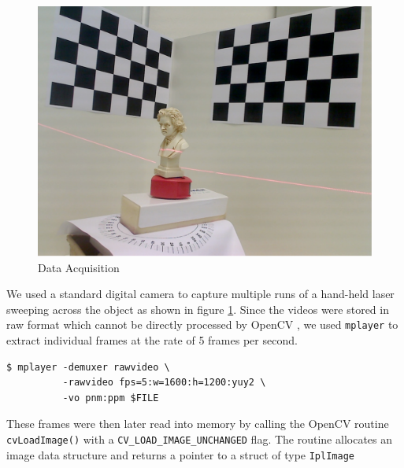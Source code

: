 \begin{figure}[ht!]
\centering
\includegraphics[width=0.5\linewidth]{figures/introduction}
\caption{Data Acquisition}
\label{figure:acquisition}
\end{figure}

We used a standard digital camera to capture multiple runs of a hand-held
laser sweeping across the object as shown in figure \ref{figure:acquisition}.
Since the videos were stored in raw format which cannot be directly processed
by OpenCV \cite{bradski:2008}, we used \texttt{mplayer} to extract individual
frames at the rate of 5 frames per second.

\begin{verbatim}
$ mplayer -demuxer rawvideo \
          -rawvideo fps=5:w=1600:h=1200:yuy2 \
          -vo pnm:ppm $FILE
\end{verbatim}

These frames were then later read into memory by calling the OpenCV routine
\texttt{cvLoadImage()} with a \texttt{CV\_LOAD\_IMAGE\_UNCHANGED} flag. The
routine allocates an image data structure and returns a pointer to a struct of
type \texttt{IplImage}
